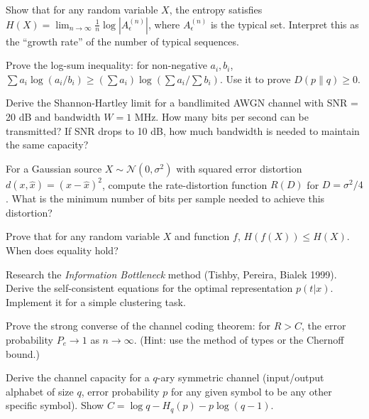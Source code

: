 \begin{exercise}[Intermediate]
Show that for any random variable $X$, the entropy satisfies $H(X) = \lim_{n\to\infty} \frac{1}{n} \log |A_\epsilon^{(n)}|$, where $A_\epsilon^{(n)}$ is the typical set. Interpret this as the ``growth rate'' of the number of typical sequences.
\end{exercise}

\begin{exercise}[Intermediate]
Prove the log-sum inequality: for non-negative $a_i, b_i$, $\sum a_i \log(a_i/b_i) \ge (\sum a_i) \log(\sum a_i / \sum b_i)$. Use it to prove $D(p\|q) \ge 0$.
\end{exercise}

\begin{exercise}[Intermediate]
Derive the Shannon-Hartley limit for a bandlimited AWGN channel with SNR = 20 dB and bandwidth $W = 1$ MHz. How many bits per second can be transmitted? If SNR drops to 10 dB, how much bandwidth is needed to maintain the same capacity?
\end{exercise}

\begin{exercise}[Intermediate]
For a Gaussian source $X \sim \mathcal{N}(0,\sigma^2)$ with squared error distortion $d(x,\hat{x}) = (x-\hat{x})^2$, compute the rate-distortion function $R(D)$ for $D = \sigma^2/4$. What is the minimum number of bits per sample needed to achieve this distortion?
\end{exercise}

\begin{exercise}[Intermediate]
Prove that for any random variable $X$ and function $f$, $H(f(X)) \le H(X)$. When does equality hold?
\end{exercise}

\begin{exercise}[Challenge]
Research the \emph{Information Bottleneck} method (Tishby, Pereira, Bialek 1999). Derive the self-consistent equations for the optimal representation $p(t|x)$. Implement it for a simple clustering task.
\end{exercise}

\begin{exercise}[Challenge]
Prove the strong converse of the channel coding theorem: for $R > C$, the error probability $P_e \to 1$ as $n \to \infty$. (Hint: use the method of types or the Chernoff bound.)
\end{exercise}

\begin{exercise}[Challenge]
Derive the channel capacity for a $q$-ary symmetric channel (input/output alphabet of size $q$, error probability $p$ for any given symbol to be any other specific symbol). Show $C = \log q - H_q(p) - p\log(q-1)$.
\end{exercise}

